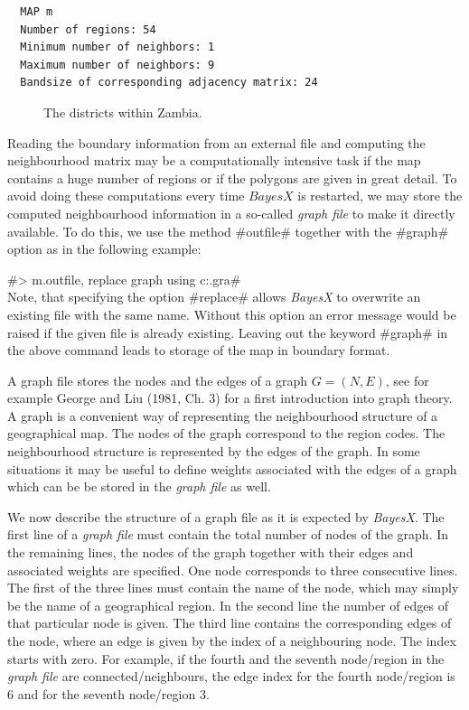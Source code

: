 \documentclass{article}
\begin{document}
\begin{verbatim}
  MAP m
  Number of regions: 54
  Minimum number of neighbors: 1
  Maximum number of neighbors: 9
  Bandsize of corresponding adjacency matrix: 24
\end{verbatim}

\begin{figure}[ht]
\begin{center}
 {\it\caption{The
districts within Zambia.\label{zambiamap}}}
\end{center}
\end{figure}

Reading the boundary information from an external file and
computing the neighbourhood matrix may be a computationally
intensive task if the map contains a huge number of regions or if
the polygons are given in great detail. To avoid doing these
computations every time $BayesX$ is restarted, we may store the
computed neighbourhood information in a so-called {\it graph file}
to make it directly available. To do this, we use the method
#outfile# together with the #graph# option as in the following
example:

#> m.outfile, replace graph using c:\data\zambia.gra#\\

Note, that specifying the option #replace# allows {\it BayesX} to
overwrite an existing file with the same name. Without this option
an error message would be raised if the given file is already
existing. Leaving out the keyword #graph# in the above command
leads to storage of the map in boundary format.

A graph file stores the nodes and the edges of a graph $G =
(N,E)$, see for example George and Liu (1981, Ch. 3) for a first
introduction into graph theory. A graph is a convenient way of
representing the neighbourhood structure of a geographical map.
The nodes of the graph correspond to the region codes. The
neighbourhood structure is represented by the edges of the graph.
In some situations it may be useful to define weights associated
with the edges of a graph which can be be stored in the {\em graph
file} as well.

We now describe the structure of a graph file as it is expected by
{\em BayesX}. The first line of a {\em graph file} must contain
the total number of nodes of the graph. In the remaining lines,
the nodes of the graph together with their edges and associated
weights are specified. One node corresponds to three consecutive
lines. The first of the three lines must contain the name of the
node, which may simply be the name of a geographical region. In
the second line the number of edges of that particular node is
given. The third line contains the corresponding edges of the
node, where an edge is given by the index of a neighbouring node.
The index starts with zero. For example, if the fourth and the
seventh node/region in the {\em graph file} are
connected/neighbours, the edge index for the fourth node/region is
6 and for the seventh node/region 3.
\end{document}
